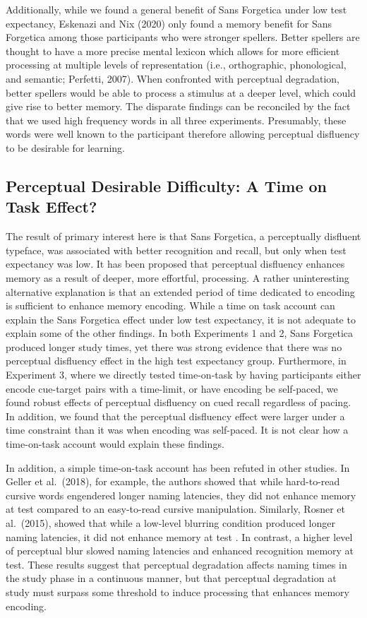 \documentclass[
  english,
  jou]{apa7}
\begin{document}
Additionally, while we found a general benefit of Sans Forgetica under low test expectancy, Eskenazi and Nix (2020) only found a memory benefit for Sans Forgetica among those participants who were stronger spellers. Better spellers are thought to have a more precise mental lexicon which allows for more efficient processing at multiple levels of representation (i.e., orthographic, phonological, and semantic; Perfetti, 2007). When confronted with perceptual degradation, better spellers would be able to process a stimulus at a deeper level, which could give rise to better memory. The disparate findings can be reconciled by the fact that we used high frequency words in all three experiments. Presumably, these words were well known to the participant therefore allowing perceptual disfluency to be desirable for learning.

\hypertarget{perceptual-desirable-difficulty-a-time-on-task-effect}{%
\subsection{Perceptual Desirable Difficulty: A Time on Task Effect?}\label{perceptual-desirable-difficulty-a-time-on-task-effect}}

The result of primary interest here is that Sans Forgetica, a perceptually disfluent typeface, was associated with better recognition and recall, but only when test expectancy was low. It has been proposed that perceptual disfluency enhances memory as a result of deeper, more effortful, processing. A rather uninteresting alternative explanation is that an extended period of time dedicated to encoding is sufficient to enhance memory encoding. While a time on task account can explain the Sans Forgetica effect under low test expectancy, it is not adequate to explain some of the other findings. In both Experiments 1 and 2, Sans Forgetica produced longer study times, yet there was strong evidence that there was no perceptual disfluency effect in the high test expectancy group. Furthermore, in Experiment 3, where we directly tested time-on-task by having participants either encode cue-target pairs with a time-limit, or have encoding be self-paced, we found robust effects of perceptual disfluency on cued recall regardless of pacing. In addition, we found that the perceptual disfluency effect were larger under a time constraint than it was when encoding was self-paced. It is not clear how a time-on-task account would explain these findings.

In addition, a simple time-on-task account has been refuted in other studies. In Geller et al.~(2018), for example, the authors showed that while hard-to-read cursive words engendered longer naming latencies, they did not enhance memory at test compared to an easy-to-read cursive manipulation. Similarly, Rosner et al.~(2015), showed that while a low-level blurring condition produced longer naming latencies, it did not enhance memory at test . In contrast, a higher level of perceptual blur slowed naming latencies and enhanced recognition memory at test. These results suggest that perceptual degradation affects naming times in the study phase in a continuous manner, but that perceptual degradation at study must surpass some threshold to induce processing that enhances memory encoding.
\end{document}
